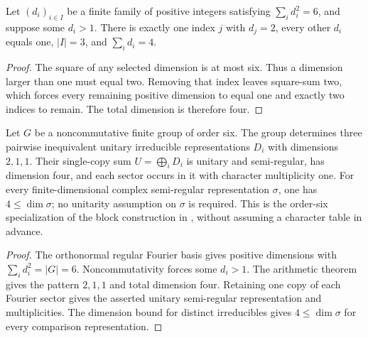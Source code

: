 \begin{lemma}%
    \label{thm:peps_order_six_dimensions}
    \leanok
    Let $(d_i)_{i\in I}$ be a finite family of positive integers satisfying
    $\sum_i d_i^2=6$, and suppose some $d_i>1$. There is exactly one index
    $j$ with $d_j=2$, every other $d_i$ equals one, $|I|=3$, and $\sum_i d_i=4$.
\end{lemma}
\begin{proof}\leanok
    The square of any selected dimension is at most six. Thus a dimension
    larger than one must equal two. Removing that index leaves square-sum two,
    which forces every remaining positive dimension to equal one and exactly
    two indices to remain. The total dimension is therefore four.
\end{proof}

\begin{lemma}%
    \label{thm:peps_order_six_smallest_semiregular}
    \leanok
    Let $G$ be a noncommutative finite group of order six. The group determines
    three pairwise inequivalent unitary irreducible representations $D_i$ with
    dimensions $2,1,1$. Their single-copy sum $U=\bigoplus_iD_i$ is unitary
    and semi-regular, has dimension four, and each sector occurs in it with
    character multiplicity one. For every finite-dimensional complex
    semi-regular representation $\sigma$, one has $4\leq\dim\sigma$;
    no unitarity assumption on $\sigma$ is required.
    This is the order-six specialization of the block construction in
    \cite[Section 7]{Schuch2010PEPS}, without assuming a character table in advance.
\end{lemma}
\begin{proof}\leanok
    The orthonormal regular Fourier basis gives positive dimensions
    with $\sum_i d_i^2=|G|=6$. Noncommutativity forces some $d_i>1$.
    The arithmetic theorem gives the pattern $2,1,1$ and total dimension four.
    Retaining one copy of each Fourier sector gives the asserted unitary
    semi-regular representation and multiplicities. The dimension bound for
    distinct irreducibles gives $4\leq\dim\sigma$ for every comparison
    representation.
\end{proof}
